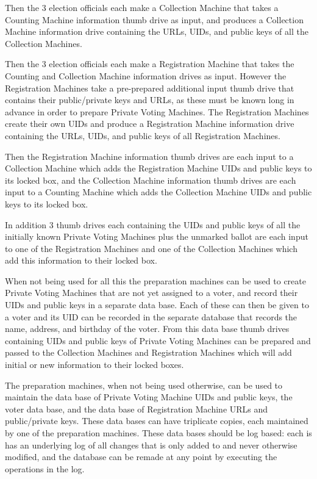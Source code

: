 \documentclass[12pt]{article}
\begin{document}
Then the 3 election officials each make a Collection Machine
that takes a Counting Machine information thumb drive as input,
and produces a Collection Machine information drive containing
the URLs, UIDs, and public keys of all the Collection Machines.

Then the 3 election officials each make a Registration Machine
that takes the Counting and Collection Machine information
drives as input.  However the Registration Machines take
a pre-prepared additional input thumb drive that contains
their public/private keys and URLs, as these must be known
long in advance in order to prepare Private Voting Machines.
The Registration Machines create their own UIDs
and produce a Registration Machine information
drive containing the URLs, UIDs, and public keys of all Registration
Machines.

Then the Registration Machine information thumb drives are each input
to a Collection Machine which adds the Registration Machine
UIDs and public keys to its locked
box, and the Collection Machine information thumb drives are each
input to a Counting Machine which adds the Collection Machine
UIDs and public keys to its locked box.

In addition 3 thumb drives each containing the UIDs and public
keys of all the initially known Private Voting Machines plus
the unmarked ballot are
each input to one of the Registration Machines and one of the
Collection Machines which add this information to their locked
box.

When not being used for all this the preparation machines can
be used to create Private Voting Machines that are not yet
assigned to a voter, and record their UIDs and public keys
in a separate data base.  Each of these can then be given to a voter
and its UID can be recorded in the separate database that records
the name, address, and birthday of the voter.  From this
data base thumb drives containing UIDs and public keys of
Private Voting Machines can be prepared and passed to the
Collection Machines and Registration Machines which will add
initial or new information to their locked boxes.

The preparation machines, when not being used otherwise, can
be used to maintain the data base of Private Voting Machine
UIDs and public keys,
the voter data base, and the data base of
Registration Machine URLs and public/private keys.
These data bases can have triplicate copies, each maintained
by one of the preparation machines.  These data bases should
be log based: each is has an underlying log of all changes
that is only added to and never otherwise modified,
and the database can be remade at any point by executing the
operations in the log.
\end{document}
